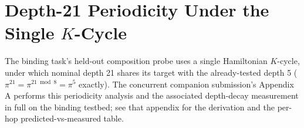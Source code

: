 \section{Depth-21 Periodicity Under the Single $K$-Cycle}
\label{app:period}

The binding task's held-out composition probe uses a single Hamiltonian
$K$-cycle, under which nominal depth 21 shares its target with the
already-tested depth 5 ($\pi^{21} = \pi^{21 \bmod 8} = \pi^5$ exactly).
The concurrent companion submission's Appendix A performs this
periodicity analysis and the associated depth-decay measurement in full
on the binding testbed; see that appendix for the derivation and the
per-hop predicted-vs-measured table.
